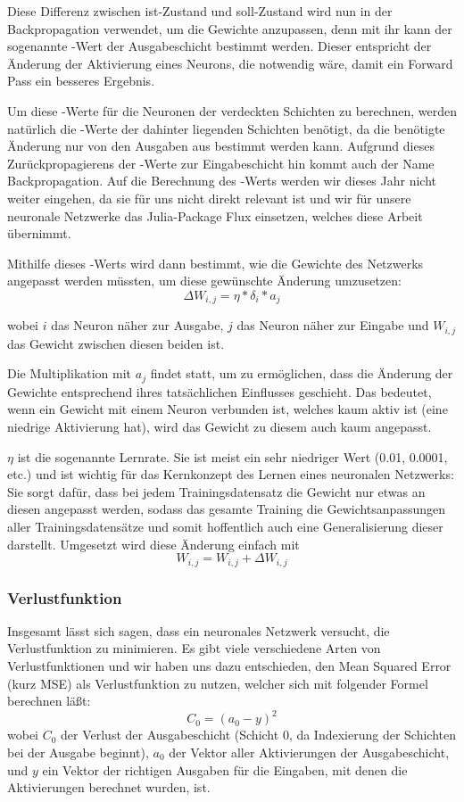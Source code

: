 \documentclass[10pt]{article}
\newcommand{\form}[1]{#1} %
\begin{document}
Diese Differenz zwischen ist-Zustand und soll-Zustand wird nun in der Backpropagation verwendet, um die Gewichte anzupassen, denn mit ihr kann der sogenannte \textD-Wert der Ausgabeschicht bestimmt werden.
Dieser entspricht der Änderung der Aktivierung eines Neurons, die notwendig wäre, damit ein Forward Pass ein besseres Ergebnis.

Um diese \textD-Werte für die Neuronen der verdeckten Schichten zu berechnen, werden natürlich die \textD-Werte der dahinter liegenden Schichten benötigt, da die benötigte Änderung nur von den Ausgaben aus bestimmt werden kann.
Aufgrund dieses Zurückpropagierens der \textD-Werte zur Eingabeschicht hin kommt auch der Name Backpropagation.
Auf die Berechnung des \textD-Werts werden wir dieses Jahr nicht weiter eingehen, da sie für uns nicht direkt relevant ist und wir für unsere neuronale Netzwerke das Julia-Package Flux einsetzen, welches diese Arbeit übernimmt.

Mithilfe dieses \textD-Werts wird dann bestimmt, wie die Gewichte des Netzwerks angepasst werden müssten, um diese gewünschte Änderung umzusetzen:
%
\form{\[
	\Delta W_{i,j} = \eta * \delta_i * a_j
\]}

\noindent wobei $i$ das Neuron näher zur Ausgabe, $j$ das Neuron näher zur Eingabe und $W_{i,j}$ das Gewicht zwischen diesen beiden ist.

Die Multiplikation mit $a_j$ findet statt, um zu ermöglichen, dass die Änderung der Gewichte entsprechend ihres tatsächlichen Einflusses geschieht. Das bedeutet, wenn ein Gewicht mit einem Neuron verbunden ist, welches kaum aktiv ist (eine niedrige Aktivierung hat), wird das Gewicht zu diesem auch kaum angepasst.

$\eta$ ist die sogenannte Lernrate.
Sie ist meist ein sehr niedriger Wert (0.01, 0.0001, etc.) und ist wichtig für das Kernkonzept des Lernen eines neuronalen Netzwerks:
Sie sorgt dafür, dass bei jedem Trainingsdatensatz die Gewicht nur etwas an diesen angepasst werden, sodass das gesamte Training die Gewichtsanpassungen aller Trainingsdatensätze und somit hoffentlich auch eine Generalisierung dieser darstellt.
Umgesetzt wird diese Änderung einfach mit
\form{\[
    W_{i,j} = W_{i,j} + \Delta W_{i,j}
\]}

\subsubsection{Verlustfunktion}

Insgesamt lässt sich sagen, dass ein neuronales Netzwerk versucht, die Verlustfunktion zu minimieren.
Es gibt viele verschiedene Arten von Verlustfunktionen %
und wir haben uns dazu entschieden, den Mean Squared Error (kurz MSE) als Verlustfunktion zu nutzen, welcher sich mit folgender Formel berechnen läßt:
%
\form{ \[
	C_0 = (a_0 - y)^2
\]}
\noindent wobei $C_0$ der Verlust der Ausgabeschicht (Schicht $0$, da Indexierung der Schichten bei der Ausgabe beginnt), $a_0$ der Vektor aller Aktivierungen der Ausgabeschicht, und $y$ ein Vektor der richtigen Ausgaben für die Eingaben, mit denen die Aktivierungen berechnet wurden, ist.
\end{document}
